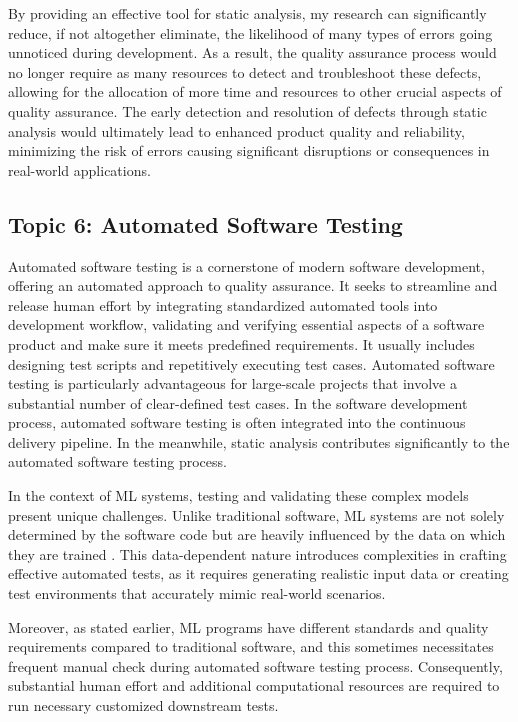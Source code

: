 \documentclass[11pt]{article}
\begin{document}
By providing an effective tool for static analysis, my research can significantly reduce, if not altogether eliminate, the likelihood of many types of errors going unnoticed during development. As a result, the quality assurance process would no longer require as many resources to detect and troubleshoot these defects, allowing for the allocation of more time and resources to other crucial aspects of quality assurance. The early detection and resolution of defects through static analysis would ultimately lead to enhanced product quality and reliability, minimizing the risk of errors causing significant disruptions or consequences in real-world applications.

\subsection*{ Topic 6: Automated Software Testing }

Automated software testing is a cornerstone of modern software development, offering an automated approach to quality assurance. It seeks to streamline and release human effort by integrating standardized automated tools into development workflow, validating and verifying essential aspects of a software product and make sure it meets predefined requirements. It usually includes designing test scripts and repetitively executing test cases. Automated software testing is particularly advantageous for large-scale projects that involve a substantial number of clear-defined test cases. In the software development process, automated software testing is often integrated into the continuous delivery pipeline. In the meanwhile, static analysis contributes significantly to the automated software testing process.

In the context of ML systems, testing and validating these complex models present unique challenges. Unlike traditional software, ML systems are not solely determined by the software code but are heavily influenced by the data on which they are trained \cite{riccioTestingMachineLearning2020}. This data-dependent nature introduces complexities in crafting effective automated tests, as it requires generating realistic input data or creating test environments that accurately mimic real-world scenarios. 

Moreover, as stated earlier, ML programs have different standards and quality requirements compared to traditional software, and this sometimes necessitates frequent manual check during automated software testing process. Consequently, substantial human effort and additional computational resources are required to run necessary customized downstream tests. 
\end{document}
